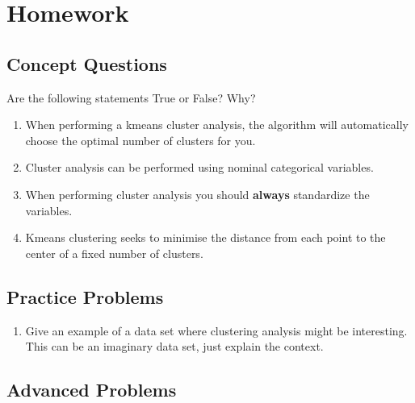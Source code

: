\documentclass[
]{book}
\providecommand{\tightlist}{%
  \setlength{\itemsep}{0pt}\setlength{\parskip}{0pt}}
\theoremstyle{definition}
\theoremstyle{definition}
\theoremstyle{definition}
\theoremstyle{definition}
\theoremstyle{remark}
\begin{document}
\hypertarget{homework-3}{%
\section{Homework}\label{homework-3}}

\hypertarget{concept-questions-3}{%
\subsection{Concept Questions}\label{concept-questions-3}}

Are the following statements True or False? Why?

\begin{enumerate}
\def\labelenumi{\arabic{enumi}.}
\item
  When performing a kmeans cluster analysis, the algorithm will automatically choose the optimal number of clusters for you.
\item
  Cluster analysis can be performed using nominal categorical variables.
\item
  When performing cluster analysis you should \textbf{always} standardize the variables.
\item
  Kmeans clustering seeks to minimise the distance from each point to the center of a fixed number of clusters.
\end{enumerate}

\hypertarget{practice-problems-3}{%
\subsection{Practice Problems}\label{practice-problems-3}}

\begin{enumerate}
\def\labelenumi{\arabic{enumi}.}
\tightlist
\item
  Give an example of a data set where clustering analysis might be interesting. This can be an imaginary data set, just explain the context.
\end{enumerate}

\hypertarget{advanced-problems-3}{%
\subsection{Advanced Problems}\label{advanced-problems-3}}
\end{document}
